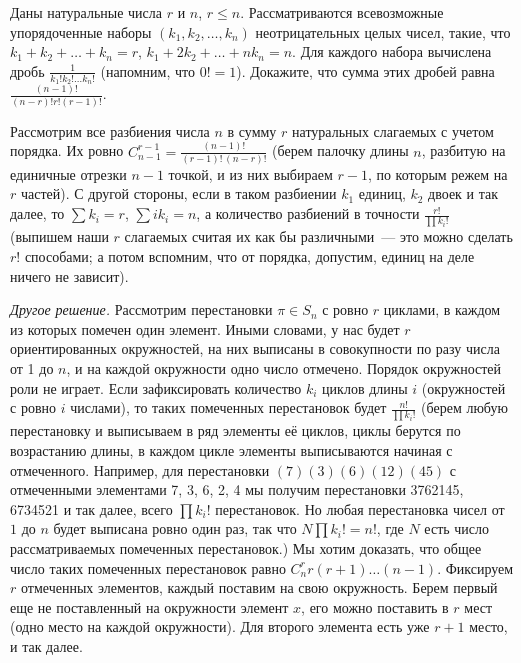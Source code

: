 \problem
Даны натуральные числа $r$ и $n$, $r \leq n$.
Рассматриваются всевозможные упорядоченные наборы $(k_1, k_2, \ldots, k_n)$
неотрицательных целых чисел, такие, что
$k_1 + k_2 + \ldots + k_n = r$, $k_1 + 2 k_2 + \ldots + n k_n = n$.
Для каждого набора вычислена дробь $\frac{1}{k_1! k_2! \ldots k_n!}$
(напомним, что $0! = 1$).
Докажите, что сумма этих дробей равна
\(
    \frac{(n - 1)!}{(n - r)! r! (r - 1)!}
\).

\solution
Рассмотрим все разбиения числа $n$ в сумму $r$ натуральных слагаемых с учетом
порядка.
Их ровно
$C_{n - 1}^{r - 1} = \frac{(n - 1)!}{(r - 1)! \, (n - r)!}$
(берем палочку длины $n$, разбитую на единичные отрезки $n - 1$ точкой, и из
них выбираем $r - 1$, по которым режем на $r$ частей).
С другой стороны, если в таком разбиении $k_1$ единиц, $k_2$ двоек и так далее,
то $\sum k_i = r$, $\sum i k_i = n$, а количество разбиений в точности
$\frac{r!}{\prod k_i!}$
(выпишем наши $r$ слагаемых считая их как бы различными~--- это можно сделать
$r!$ способами;
а потом вспомним, что от порядка, допустим, единиц на деле ничего не зависит).
\par
\emph{Другое решение.}
Рассмотрим перестановки $\pi \in S_n$ с ровно $r$ циклами, в каждом из которых
помечен один элемент.
Иными словами, у нас будет $r$ ориентированных окружностей, на них выписаны в
совокупности по разу числа от 1 до $n$, и на каждой окружности одно число
отмечено.
Порядок окружностей роли не играет.
Если зафиксировать количество $k_i$ циклов длины $i$
(окружностей с ровно $i$ числами), то таких помеченных перестановок будет
$\frac{n!}{\prod k_i!}$
(берем любую перестановку и выписываем в ряд элементы её циклов, циклы берутся
по возрастанию длины, в каждом цикле элементы выписываются начиная с
отмеченного.
Например, для перестановки $(7) (3) (6) (1 2) (4 5)$ с отмеченными элементами
7, 3, 6, 2, 4 мы получим перестановки 3762145, 6734521 и так далее, всего
$\prod k_i!$ перестановок.
Но любая перестановка чисел от $1$ до $n$ будет выписана ровно один раз, так
что $N \prod k_i! = n!$, где $N$ есть число рассматриваемых помеченных
перестановок.)
Мы хотим доказать, что общее число таких помеченных перестановок равно
$C_n^{r} r (r + 1) \ldots (n - 1)$.
Фиксируем $r$ отмеченных элементов, каждый поставим на свою окружность.
Берем первый еще не поставленный на окружности элемент $x$, его можно поставить
в $r$ мест (одно место на каждой окружности).
Для второго элемента есть уже $r + 1$ место, и так далее.

\endproblem
